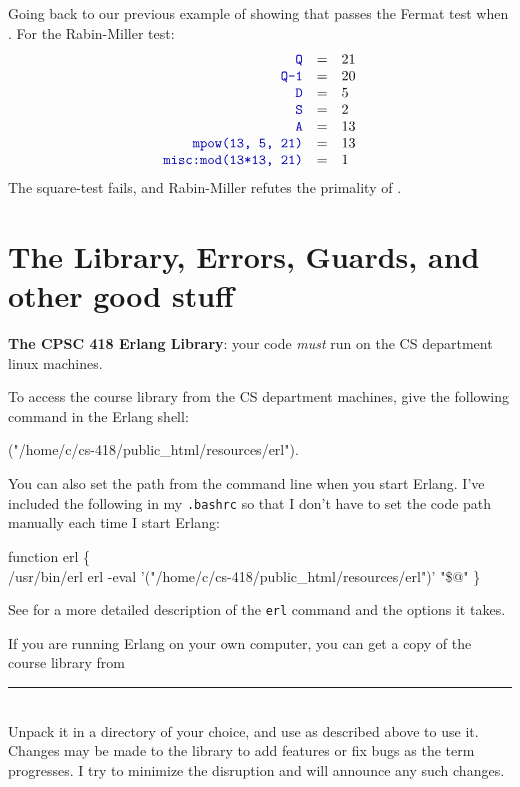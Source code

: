 \documentclass{article}
\begin{document}
  Going back to our previous example of showing that  passes the Fermat test when
  .  For the Rabin-Miller test:
   \begin{displaymath}\begin{array}{rcl}
     \code{Q}                &=& 21\\
     \code{Q-1}              &=& 20\\
     \code{D}                &=& 5\\
     \code{S}                &=& 2\\
     \code{A}                &=& 13\\
     \code{mpow(13, 5, 21)}  &=& 13\\
     \code{misc:mod(13*13, 21)} &=& 1
   \end{array}\end{displaymath}
   The square-test fails, and Rabin-Miller refutes the primality of .

\section*{The Library, Errors, Guards, and other good stuff}\label{sec:code}
\textbf{The CPSC 418 Erlang Library}: your code \emph{must} run on the CS department linux machines.

To access the course library from the CS department machines, give the following command in the Erlang shell:
\begin{xcode}
  \eprompt{} \addpath{}("/home/c/cs-418/public\_html/resources/erl").
\end{xcode}
You can also set the path from the command line when you start Erlang.  I've
included the following in my \texttt{.bashrc} so that I don't have to set the
code path manually each time I start Erlang:
\begin{xcode}
  function erl \{\\
  \>/usr/bin/erl erl -eval '\addpath{}("/home/c/cs-418/public\_html/resources/erl")' "\$@"
  \}  
\end{xcode}
See  for a more detailed description of
the \texttt{erl} command and the options it takes.

If you are running Erlang on your own computer, you can get a copy of the course library from\\
\rule{1.5em}{0ex}\\
Unpack it in a directory of your choice, and use \code{\addpath{}} as described above
to use it.  Changes may be made to the library to add features or fix bugs as the term progresses.
I try to minimize the disruption and will announce any such changes.
\end{document}
